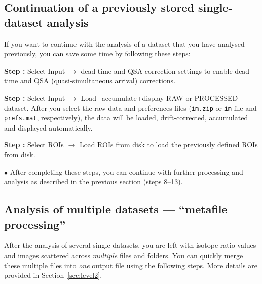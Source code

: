 \documentclass[a4paper, 11pt]{article}
\newcommand{\ttt}[1]{\texttt{#1}}
\newcommand{\lans}[1]{{\color{magenta}#1}}
\newcommand\ra{\rightarrow}
\newcommand\addon[1]{-- {\small #1}}
\newcounter{step}
\newcommand\s{\addtocounter{step}{1}\vskip5pt\noindent\textbf{Step \thestep:}{ }}
\newcommand\bul{\vskip5pt\noindent$\bullet${ }}
\begin{document}
\subsection{Continuation of a previously stored single-dataset analysis}
\setcounter{step}{0}

If you want to continue with the analysis of a dataset that you have analysed previously, you can save some time by following these steps:

\s Select \lans{Input} $\ra$ \lans{dead-time and QSA correction settings} to enable dead-time and QSA (quasi-simultaneous arrival) corrections.

\s Select \lans{Input} $\ra$ \lans{Load+accumulate+display RAW or PROCESSED dataset}. After you select the raw data and preferences files (\ttt{im.zip} or \ttt{im} file and \ttt{prefs.mat}, respectively), the data will be loaded, drift-corrected, accumulated and displayed automatically.


 
\s Select \lans{ROIs} $\ra$ \lans{Load ROIs from disk} to load the previously defined ROIs from disk.



\bul After completing these steps, you can continue with further processing and analysis as described in the previous section (steps 8--13).


\subsection{Analysis of multiple datasets --- ``metafile processing''}
\setcounter{step}{0}

After the analysis of several single datasets, you are left with isotope ratio values and images scattered across \emph{multiple} files and folders. You can quickly merge these multiple files into \emph{one} output file using the following steps. More details are provided in Section~\ref{sec:level2}.
\end{document}

